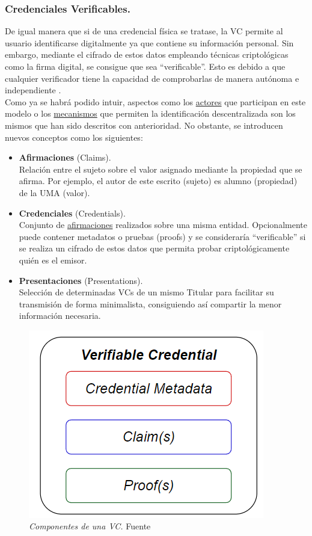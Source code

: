 \documentclass[../main.tex]{subfiles}
\begin{document}
\newpage
\subsubsection{Credenciales Verificables.}
De igual manera que si de una credencial física se tratase, la \acrfull{VC} permite al usuario identificarse digitalmente ya que contiene su información personal. Sin embargo, mediante el cifrado de estos datos empleando técnicas criptológicas como la \Gls{firma digital}, se consigue que sea ``verificable''. Esto es debido a que cualquier verificador tiene la capacidad de comprobarlas de manera autónoma e independiente \cite{VC-data-model}.  
\\

Como ya se habrá podido intuir, aspectos como los \hyperref[Actores y sus funciones en el paradigma]{actores} que participan en este modelo o los \hyperref[Identificadores Descentralizados]{mecanismos} que permiten la identificación descentralizada son los mismos que han sido descritos con anterioridad. No obstante, se introducen nuevos conceptos como los siguientes:

\begin{itemize}
    \item \textbf{Afirmaciones} (Claims). \\
    Relación entre el sujeto sobre el valor asignado mediante la propiedad que se afirma. Por ejemplo, el autor de este escrito (sujeto) es alumno (propiedad) de la UMA (valor).
    
    \item \textbf{Credenciales} (Credentials). \\
    Conjunto de \underline{afirmaciones} realizados sobre una misma entidad. Opcionalmente puede contener metadatos o pruebas (proofs) y se consideraría ``verificable'' si se realiza un cifrado de estos datos que permita probar criptológicamente quién es el emisor.

    \item \textbf{Presentaciones} (Presentations). \\
    Selección de determinadas \acrshort{VC}s de un mismo Titular para facilitar su transmisión de forma minimalista, consiguiendo así compartir la menor información necesaria.
    \\
    
\end{itemize}

\begin{figure}[htbp]
    \centering
    \includegraphics[width=0.3\linewidth]{images/CredencialVerificable.png}
    \caption{\textit{Componentes de una \acrshort{VC}.} Fuente \cite{VC-data-model}}
    \label{fig:VC}
\end{figure}
\end{document}
